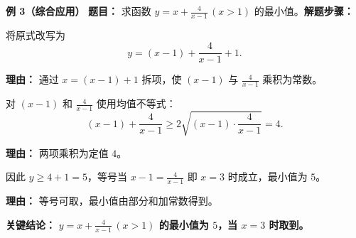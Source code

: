 \begin{examplebox}
	\medskip
	\textbf{\textcolor{CExample}{例 3（综合应用）}}
	\textbf{\textcolor{CExample}{题目：}} 求函数 $y=x+\frac{4}{x-1}\,(x>1)$ 的最小值。\textbf{\textcolor{CExample}{解题步骤：}}
	\begin{description}[style=nextline, leftmargin=2.8em, labelsep=0.5em, itemsep=0.45em]
		\item[\textbf{第一步（拆项变形）：}]
			将原式改写为
			\[
				y = (x-1)+\frac{4}{x-1}+1.
			\]
			\par\textbf{理由：} 通过 $x=(x-1)+1$ 拆项，使 $(x-1)$ 与 $\frac{4}{x-1}$ 乘积为常数。
		\item[\textbf{第二步（均值求部分和）：}]
			对 $(x-1)$ 和 $\frac{4}{x-1}$ 使用均值不等式：
			\[
				(x-1)+\frac{4}{x-1} \ge 2\sqrt{(x-1)\cdot\frac{4}{x-1}} = 4.
			\]
			\par\textbf{理由：} 两项乘积为定值 $4$。
		\item[\textbf{第三步（得最小值）：}]
			因此 $y \ge 4+1 = 5$，等号当 $x-1 = \frac{4}{x-1}$ 即 $x=3$ 时成立，最小值为 $5$。
			\par\textbf{理由：} 等号可取，最小值由部分和加常数得到。
	\end{description}
	\textbf{\textcolor{CExample}{关键结论：}}
	\textbf{$y=x+\frac{4}{x-1}\,(x>1)$ 的最小值为 $5$，当 $x=3$ 时取到。}
\end{examplebox}
